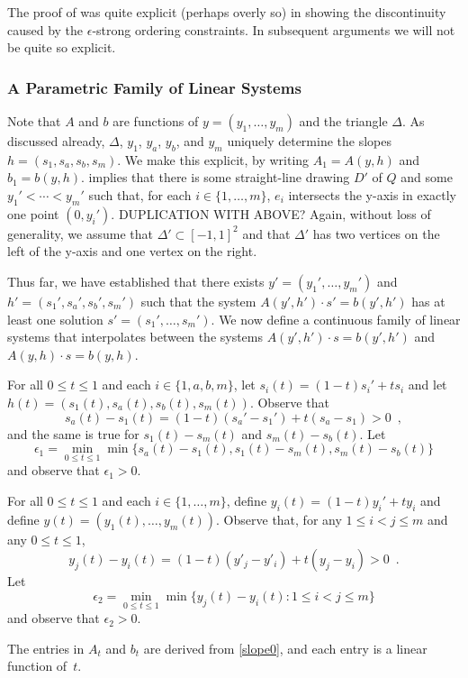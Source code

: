 \documentclass{patmorin}
\begin{document}
The proof of  was quite explicit (perhaps overly so)
in showing the discontinuity caused by the $\epsilon$-strong ordering
constraints.  In subsequent arguments we will not be quite so explicit.

\subsubsection{A Parametric Family of Linear Systems}

Note that $A$ and $b$ are functions of $y=(y_1,\ldots,y_m)$ and
the triangle $\Delta$. As discussed already, $\Delta$, $y_1$, $y_a$,
$y_b$, and $y_m$ uniquely determine the slopes $h=(s_1,s_a,s_b,s_m)$.
We make this explicit, by writing
$A_1=A(y,h)$ and $b_1=b(y,h)$.
implies that there is some straight-line drawing $D'$ of $Q$ and some
$y_1'<\cdots< y_m'$ such that, for each $i\in\{1,\ldots,m\}$, $e_i$
intersects the y-axis in exactly one point $(0,y_i')$.
DUPLICATION WITH ABOVE?
  Again, without
loss of generality, we assume that $\Delta'\subset [-1,1]^2$ and that
$\Delta'$ has two vertices on the left of the y-axis and one vertex on
the right.

Thus far, we have established that there exists $y'=(y_1',\ldots,y_m')$
and $h'=(s_1',s_a',s_b',s_m')$ such that the system
$A(y',h')\cdot s' = b(y',h')$ has at least one solution
$s'=(s_1',\ldots,s_m')$.  We now define a continuous family of linear
systems that interpolates between the systems $A(y',h')\cdot
s=b(y',h')$ and $A(y,h)\cdot s=b(y,h)$.

For all $0\le t\le 1$ and each $i\in\{1,a,b,m\}$, 
let $s_i(t)=(1-t)s_i' + ts_i$ and let
$h(t)=(s_1(t),s_a(t),s_b(t),s_m(t))$.
Observe that
\[  
    s_a(t)-s_1(t) = (1-t)(s_a'-s_1') + t(s_a-s_1) > 0 \enspace ,
\]
and the same is true for $s_1(t)-s_m(t)$ and $s_m(t)-s_b(t)$.  Let
\[
     \epsilon_1 = \min_{0\le t\le 1}\min\{s_a(t)-s_1(t), s_1(t)-s_m(t), s_m(t)-s_b(t)\}
\]
and observe that $\epsilon_1>0$.

For all $0\le t\le 1$ and each $i\in\{1,\ldots,m\}$, define $y_i(t) = (1-t)y_i' + ty_i$ and define $y(t)=(y_1(t),\ldots,y_m(t))$.
Observe that, for any
$1\le i< j\le m$ and any $0\le t\le 1$,
\[
   y_j(t) - y_i(t) = (1-t)(y'_j-y'_i) + t(y_j-y_i) > 0 \enspace .
\]
Let 
\[    \epsilon_2=\min_{0\le t\le 1}\min\{y_j(t)-y_i(t): 1\le i< j\le m\}
\]
and observe that $\epsilon_2 >0$.  

The entries in $A_t$ and $b_t$ are derived from \eqref{slope0}, and
each entry is a linear function of~$t$.  
\end{document}
